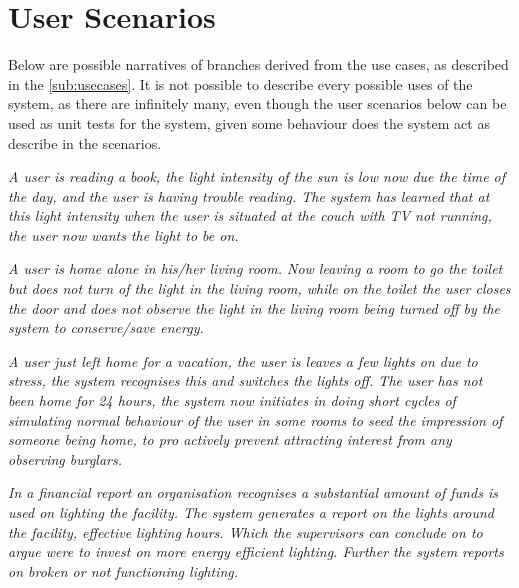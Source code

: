 \section{User Scenarios}\label{sub:userscenarios}

Below are possible narratives of branches derived from the use cases, as described in the \cref{sub:usecases}. It is not possible to describe every possible uses of the system, as there are infinitely many, even though the user scenarios below can be used as unit tests for the system, given some behaviour does the system act as describe in the scenarios.

\textit{A user is reading a book, the light intensity of the sun is low now due the time of the day, and the user is having trouble reading. The system has learned that at this light intensity when the user is situated at the couch with TV not running, the user now wants the light to be on.}

\textit{A user is home alone in his/her living room. Now leaving a room to go the toilet but does not turn of the light in the living room, while on the toilet the user closes the door and does not observe the light in the living room being turned off by the system to conserve/save energy.}

\textit{A user just left home for a vacation, the user is leaves a few lights on due to stress, the system recognises this and switches the lights off. The user has not been home for 24 hours, the system now initiates in doing short cycles of simulating normal behaviour of the user in some rooms to seed the impression of someone being home, to pro actively prevent attracting interest from any observing burglars.}

\textit{In a financial report an organisation recognises a substantial amount of funds is used on lighting the facility. The system generates a report on the lights around the facility, effective lighting hours. Which the supervisors can conclude on to argue were to invest on more energy efficient lighting. Further the system reports on broken or not functioning lighting.}


